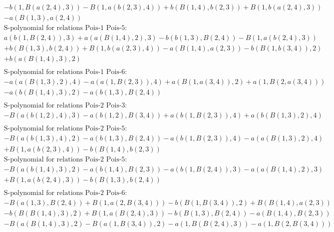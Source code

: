 \documentclass[11pt]{amsart}
\begin{document}
\begin{align*}
 &  - b(1,B(a(2,4),3)) - B(1,a(b(2,3),4)) + b(B(1,4),b(2,3)) + B(1,b(a(2,4),3))\\ 
 &  - a(B(1,3),a(2,4)) \\ 
& \text{S-polynomial for relations Pois-1 Pois-5:} \\ 
&a(b(1,B(2,4)),3) + a(a(B(1,4),2),3) - b(b(1,3),B(2,4)) - B(1,a(b(2,4),3))\\ 
 &  + b(B(1,3),b(2,4)) + B(1,b(a(2,3),4)) - a(B(1,4),a(2,3)) - b(B(1,b(3,4)),2)\\ 
 &  + b(a(B(1,4),3),2) \\ 
\end{align*}\begin{align*} 
& \text{S-polynomial for relations Pois-1 Pois-6:} \\ 
& - a(a(B(1,3),2),4) - a(a(1,B(2,3)),4) + a(B(1,a(3,4)),2) + a(1,B(2,a(3,4)))\\ 
 &  - a(b(B(1,4),3),2) - a(b(1,3),B(2,4)) \\ 
\end{align*}\begin{align*} 
& \text{S-polynomial for relations Pois-2 Pois-3:} \\ 
& - B(a(b(1,2),4),3) - a(b(1,2),B(3,4)) + a(b(1,B(2,3)),4) + a(b(B(1,3),2),4) \\ 
\end{align*}\begin{align*} 
& \text{S-polynomial for relations Pois-2 Pois-5:} \\ 
& - B(a(b(1,3),4),2) - a(b(1,3),B(2,4)) - a(b(1,B(2,3)),4) - a(a(B(1,3),2),4)\\ 
 &  + B(1,a(b(2,3),4)) - b(B(1,4),b(2,3)) \\ 
& \text{S-polynomial for relations Pois-2 Pois-5:} \\ 
& - B(a(b(1,4),3),2) - a(b(1,4),B(2,3)) - a(b(1,B(2,4)),3) - a(a(B(1,4),2),3)\\ 
 &  + B(1,a(b(2,4),3)) - b(B(1,3),b(2,4)) \\ 
\end{align*}\begin{align*} 
& \text{S-polynomial for relations Pois-2 Pois-6:} \\ 
& - B(a(1,3),B(2,4)) + B(1,a(2,B(3,4))) - b(B(1,B(3,4)),2) + B(B(1,4),a(2,3))\\ 
 &  - b(B(B(1,4),3),2) + B(1,a(B(2,4),3)) - b(B(1,3),B(2,4)) - a(B(1,4),B(2,3))\\ 
 &  - B(a(B(1,4),3),2) - B(a(1,B(3,4)),2) - a(1,B(B(2,4),3)) - a(1,B(2,B(3,4))) \\ 

\end{align*}
\end{document}
